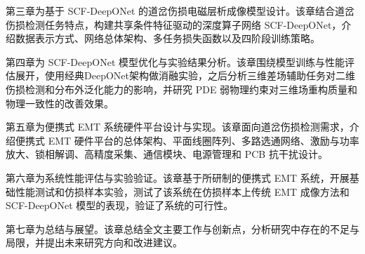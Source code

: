 第三章为基于 SCF-DeepONet 的道岔伤损电磁层析成像模型设计。该章结合道岔伤损检测任务特点，构建共享条件特征驱动的深度算子网络 SCF-DeepONet，介绍数据表示方式、网络总体架构、多任务损失函数以及四阶段训练策略。

第四章为 SCF-DeepONet 模型优化与实验结果分析。该章围绕模型训练与性能评估展开，使用经典DeepONet架构做消融实验，之后分析三维差场辅助任务对二维伤损检测和分布外泛化能力的影响，并研究 PDE 弱物理约束对三维场重构质量和物理一致性的改善效果。

第五章为便携式 EMT 系统硬件平台设计与实现。该章面向道岔伤损检测需求，介绍便携式 EMT 硬件平台的总体架构、平面线圈阵列、多路选通网络、激励与功率放大、锁相解调、高精度采集、通信模块、电源管理和 PCB 抗干扰设计。

第六章为系统性能评估与实验验证。该章基于所研制的便携式 EMT 系统，开展基础性能测试和仿损样本实验，测试了该系统在仿损样本上传统 EMT 成像方法和 SCF-DeepONet 模型的表现，验证了系统的可行性。

第七章为总结与展望。该章总结全文主要工作与创新点，分析研究中存在的不足与局限，并提出未来研究方向和改进建议。
